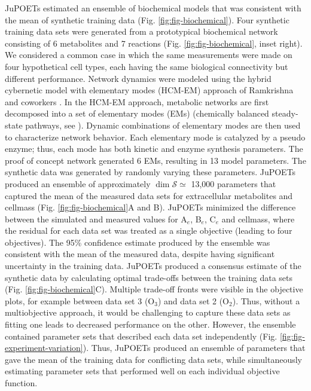 \documentclass[12pt]{article}
\begin{document}
JuPOETs estimated an ensemble of biochemical models that was consistent with the mean of synthetic training data (Fig. \ref{fig:fig-biochemical}).
Four synthetic training data sets were generated from a prototypical biochemical network consisting of 6 metabolites and 7 reactions (Fig. \ref{fig:fig-biochemical}, inset right).
We considered a common case in which the same measurements were made on four hypothetical cell types, each having the same biological connectivity but different performance.
Network dynamics were modeled using the hybrid cybernetic model with elementary modes (HCM-EM) approach of Ramkrishna and coworkers \cite{2008_kim_varner_ramkrishna_BiotechProg}.
In the HCM-EM approach, metabolic networks are first decomposed into a set of elementary modes (EMs) (chemically balanced steady-state pathways, see \cite{Schuster:2000aa}).
Dynamic combinations of elementary modes are then used to characterize network behavior.
Each elementary mode is catalyzed by a pseudo enzyme; thus, each mode has both kinetic and enzyme synthesis parameters.
The proof of concept network generated 6 EMs, resulting in 13 model parameters.
The synthetic data was generated by randomly varying these parameters.
JuPOETs produced an ensemble of approximately $\dim{\mathcal{S}}\simeq$ 13,000 parameters that captured the mean of the measured data sets for extracellular metabolites and cellmass
(Fig. \ref{fig:fig-biochemical}A and B). JuPOETs minimized the difference between the simulated and measured values for A$_{e}$, B$_{e}$, C$_{e}$ and cellmass,
where the residual for each data set was treated as a single objective (leading to four objectives).
The 95\% confidence estimate produced by the ensemble was consistent with the mean of the measured data, despite having significant
uncertainty in the training data. JuPOETs produced a consensus estimate of the synthetic data by calculating optimal trade-offs between the training data sets (Fig. \ref{fig:fig-biochemical}C). Multiple trade-off fronts were visible in the objective plots, for example between data set 3 (O$_{3}$) and data set 2 (O$_{2}$).
Thus, without a multiobjective approach, it would be challenging to capture these data sets as fitting one leads to decreased performance on the other.
However, the ensemble contained parameter sets that described each data set independently (Fig. \ref{fig:fig-experiment-variation}).
Thus, JuPOETs produced an ensemble of parameters that gave the mean of the training data for conflicting data sets,
while simultaneously estimating parameter sets that performed well on each individual objective function.
\end{document}
